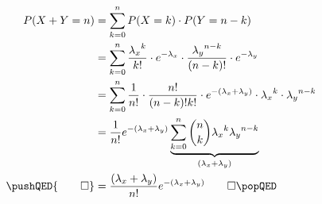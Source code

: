 \begin{equation*}
	\begin{split}
		P(X + Y = n) 	&= \sum_{k=0}^{n} P(X = k) \cdot P(Y = n-k)\\
						&= \sum_{k=0}^{n}\frac{{\lambda_{x}}^{k}}{k!}\cdot e^{-\lambda_x} \cdot \frac{{\lambda_{y}}^{n-k}}{(n-k)!}\cdot e^{-\lambda_{y}}\\
						&= \sum_{k=0}^{n} \frac{1}{n!} \cdot \frac{n!}{(n-k)! k!} \cdot e^{-(\lambda_{x}+\lambda_{y})}\cdot {\lambda_{x}}^{k}\cdot {\lambda_{y}}^{n-k}\\
						&= \frac{1}{n!}e^{-(\lambda_{x}+ \lambda_{y})} \underbrace{\sum_{k=0}^{n} {n \choose k} {\lambda_{x}}^{k}{\lambda_{y}}^{n-k}}_{(\lambda_{x}+\lambda_{y})}\\	
						\pushQED{\qed}
						&= \frac{(\lambda_{x}+\lambda_{y})}{n!}e^{-(\lambda_{x}+\lambda_{y})}		\qedhere
						\popQED
	\end{split}
\end{equation*}
